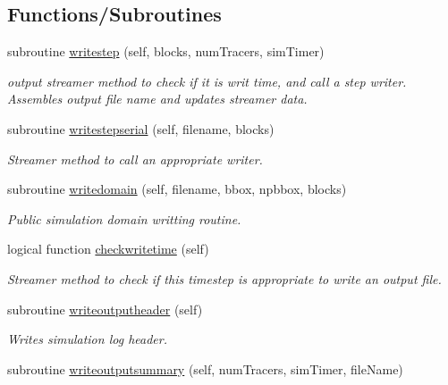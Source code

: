 \subsection*{Functions/\+Subroutines}
\begin{DoxyCompactItemize}
\item 
subroutine \mbox{\hyperlink{namespacesimulationoutputstreamer__mod_a689f65c821b78d46b142653214338b85}{writestep}} (self, blocks, num\+Tracers, sim\+Timer)
\begin{DoxyCompactList}\small\item\em output streamer method to check if it is writ time, and call a step writer. Assembles output file name and updates streamer data. \end{DoxyCompactList}\item 
subroutine \mbox{\hyperlink{namespacesimulationoutputstreamer__mod_af116b4ea9abff9117b9b1b9b5e6ab690}{writestepserial}} (self, filename, blocks)
\begin{DoxyCompactList}\small\item\em Streamer method to call an appropriate writer. \end{DoxyCompactList}\item 
subroutine \mbox{\hyperlink{namespacesimulationoutputstreamer__mod_a2c660b4331c576befebcf037b82b8d7a}{writedomain}} (self, filename, bbox, npbbox, blocks)
\begin{DoxyCompactList}\small\item\em Public simulation domain writting routine. \end{DoxyCompactList}\item 
logical function \mbox{\hyperlink{namespacesimulationoutputstreamer__mod_a81b788c12b0520901e6fc9b113a10dec}{checkwritetime}} (self)
\begin{DoxyCompactList}\small\item\em Streamer method to check if this timestep is appropriate to write an output file. \end{DoxyCompactList}\item 
subroutine \mbox{\hyperlink{namespacesimulationoutputstreamer__mod_a6f01bdc663fe5f4a842150a6aac90f67}{writeoutputheader}} (self)
\begin{DoxyCompactList}\small\item\em Writes simulation log header. \end{DoxyCompactList}\item 
subroutine \mbox{\hyperlink{namespacesimulationoutputstreamer__mod_a8b34c75e869c6409de7d6e5ceca5cca7}{writeoutputsummary}} (self, num\+Tracers, sim\+Timer, file\+Name)

\end{DoxyCompactItemize}
